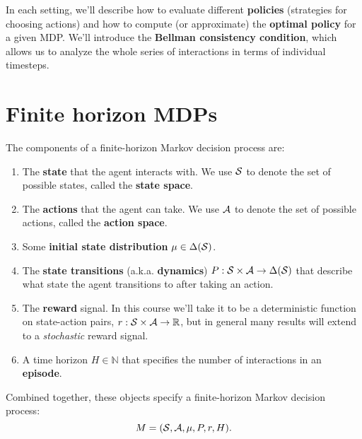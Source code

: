 \documentclass[../main/main]{subfiles}
\begin{document}
In each setting, we'll describe how to evaluate different \textbf{policies} (strategies for choosing actions) and how to compute (or approximate) the \textbf{optimal policy} for a given MDP. We'll introduce the \textbf{Bellman consistency condition}, which allows us to analyze the whole series of interactions in terms of individual timesteps.

\section{Finite horizon MDPs}

The components of a finite-horizon Markov decision process are:

\begin{enumerate}
    \item The \textbf{state} that the agent interacts with. We use $\S$ to denote the set of possible states, called the \textbf{state space}.
    \item The \textbf{actions} that the agent can take. We use $\A$ to denote the set of possible actions, called the \textbf{action space}.
    \item Some \textbf{initial state distribution} $\mu \in \Delta(\S)$.
    \item The \textbf{state transitions} (a.k.a. \textbf{dynamics}) $P : \S \times \A \to \Delta(\S)$ that describe what state the agent transitions to after taking an action.
    \item The \textbf{reward} signal. In this course we'll take it to be a deterministic function on state-action pairs, $r : \S \times \A \to \mathbb{R}$, but in general many results will extend to a \emph{stochastic} reward signal.
    \item A time horizon $H \in \mathbb{N}$ that specifies the number of interactions in an \textbf{episode}.
\end{enumerate}

Combined together, these objects specify a finite-horizon Markov decision process:
\[
    M = (\S, \A, \mu, P, r, H).
\]
\end{document}
